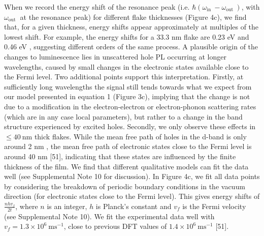 \documentclass[10pt]{article}
\begin{document}
When we record the energy shift of the resonance peak (i.e. $\hbar\left(\omega_{\text {in }}-\omega_{\text {out }}\right)$, with $\omega_{\text {out }}$ at the resonance peak) for different flake thicknesses (Figure 4c), we find that, for a given thickness, energy shifts appear approximately at multiples of the lowest shift. For example, the energy shifts for a 33.3 nm flake are 0.23 eV and 0.46 eV , suggesting different orders of the same process. A plausible origin of the changes to luminescence lies in unscattered hole PL occurring at longer wavelengths, caused by small changes in the electronic states available close to the Fermi level. Two additional points support this interpretation. Firstly, at sufficiently long wavelengths the signal still tends towards what we expect from our model presented in equation 1 (Figure 3c), implying that the change is not due to a modification in the electron-electron or electron-phonon scattering rates (which are in any case local parameters), but rather to a change in the band structure experienced by excited holes. Secondly, we only observe these effects in $\leq 40 \mathrm{~nm}$ thick flakes. While the mean free path of holes in the d-band is only around 2 nm , the mean free path of electronic states close to the Fermi level is around 40 nm [51], indicating that these states are influenced by the finite thickness of the film. We find that different qualitative models can fit the data well (see Supplemental Note 10 for discussion). In Figure 4c, we fit all data points by considering the breakdown of periodic boundary conditions in the vacuum direction (for electronic states close to the Fermi level). This gives energy shifts of $\frac{n h v_{f}}{2 t}$, where $n$ is an integer, $h$ is Planck's constant and $v_{f}$ is the Fermi velocity (see Supplemental Note 10). We fit the experimental data well with $v_{f}=1.3 \times 10^{6} \mathrm{~ms}^{-1}$, close to previous DFT values of $1.4 \times 10^{6} \mathrm{~ms}^{-1}$ [51].
\end{document}
